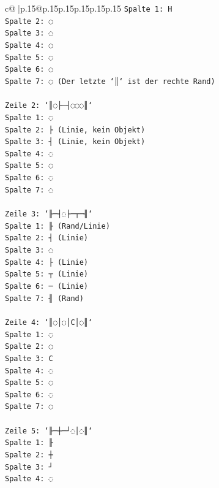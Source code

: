 \documentclass{article}
\begin{document}
{\begin{supertabular}{c@{$\;$}|p{.15\linewidth}@{}p{.15\linewidth}p{.15\linewidth}p{.15\linewidth}p{.15\linewidth}p{.15\linewidth}}
{{{\texttt{Spalte 1: H} \\
\texttt{Spalte 2: ◌} \\
\texttt{Spalte 3: ◌} \\
\texttt{Spalte 4: ◌} \\
\texttt{Spalte 5: ◌} \\
\texttt{Spalte 6: ◌} \\
\texttt{Spalte 7: ◌ (Der letzte `║` ist der rechte Rand)} \\
\\ 
\texttt{Zeile 2: `║◌├─┤◌◌◌║`} \\
\texttt{Spalte 1: ◌} \\
\texttt{Spalte 2: ├ (Linie, kein Objekt)} \\
\texttt{Spalte 3: ┤ (Linie, kein Objekt)} \\
\texttt{Spalte 4: ◌} \\
\texttt{Spalte 5: ◌} \\
\texttt{Spalte 6: ◌} \\
\texttt{Spalte 7: ◌} \\
\\ 
\texttt{Zeile 3: `╟─┤◌├─┬─╢`} \\
\texttt{Spalte 1: ╟ (Rand/Linie)} \\
\texttt{Spalte 2: ┤ (Linie)} \\
\texttt{Spalte 3: ◌} \\
\texttt{Spalte 4: ├ (Linie)} \\
\texttt{Spalte 5: ┬ (Linie)} \\
\texttt{Spalte 6: ─ (Linie)} \\
\texttt{Spalte 7: ╢ (Rand)} \\
\\ 
\texttt{Zeile 4: `║◌│◌│C│◌║`} \\
\texttt{Spalte 1: ◌} \\
\texttt{Spalte 2: ◌} \\
\texttt{Spalte 3: C} \\
\texttt{Spalte 4: ◌} \\
\texttt{Spalte 5: ◌} \\
\texttt{Spalte 6: ◌} \\
\texttt{Spalte 7: ◌} \\
\\ 
\texttt{Zeile 5: `╟─┼─┘◌│◌║`} \\
\texttt{Spalte 1: ╟} \\
\texttt{Spalte 2: ┼} \\
\texttt{Spalte 3: ┘} \\
\texttt{Spalte 4: ◌} \\
}}}
\end{supertabular}}
\end{document}
